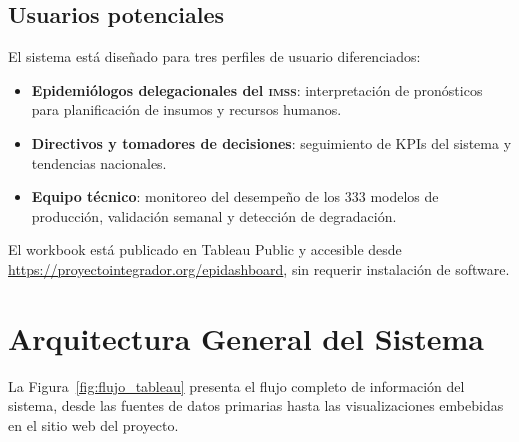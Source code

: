 \documentclass[12pt, letterpaper]{article}
\newcommand{\imss}{\textnormal{\textsc{imss}}}
\newcommand{\figref}[1]{Figura~\ref{#1}}
\begin{document}
\subsection{Usuarios potenciales}

El sistema está diseñado para tres perfiles de usuario diferenciados:

\begin{itemize}[noitemsep]
    \item \textbf{Epidemiólogos delegacionales del {\imss}}: interpretación de pronósticos para planificación de insumos y recursos humanos.
    \item \textbf{Directivos y tomadores de decisiones}: seguimiento de KPIs del sistema y tendencias nacionales.
    \item \textbf{Equipo técnico}: monitoreo del desempeño de los 333 modelos de producción, validación semanal y detección de degradación.
\end{itemize}

El workbook está publicado en Tableau Public y accesible desde \url{https://proyectointegrador.org/epidashboard}, sin requerir instalación de software.

\newpage
\section{Arquitectura General del Sistema}\label{sec:arquitectura}

La \figref{fig:flujo_tableau} presenta el flujo completo de información del sistema, desde las fuentes de datos primarias hasta las visualizaciones embebidas en el sitio web del proyecto.
\end{document}
